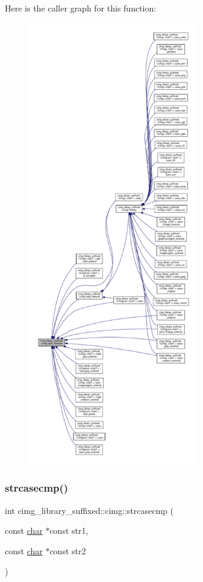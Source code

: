 Here is the caller graph for this function\+:
\nopagebreak
\begin{figure}[H]
\begin{center}
\leavevmode
\includegraphics[height=550pt]{d4/d9b/namespacecimg__library__suffixed_1_1cimg_a61e1cd854cf93fdf3f6d06525e1590c5_icgraph}
\end{center}
\end{figure}
\mbox{\label{namespacecimg__library__suffixed_1_1cimg_a1c34609cc6fef6f5fe5ffb2f69ad7989}} 
\subsubsection{\texorpdfstring{strcasecmp()}{strcasecmp()}}
{\footnotesize\ttfamily int cimg\+\_\+library\+\_\+suffixed\+::cimg\+::strcasecmp (\begin{DoxyParamCaption}\item[{const \hyperlink{classchar}{char} $\ast$const}]{str1,  }\item[{const \hyperlink{classchar}{char} $\ast$const}]{str2 }\end{DoxyParamCaption})\hspace{0.3cm}{\ttfamily [inline]}}



